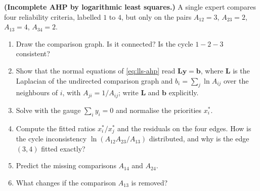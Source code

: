 \documentclass[graybox,envcountchap]{style/SNmono}
\begin{document}
\begin{prob}\label{prob:ch03:9}
\textbf{(Incomplete AHP by logarithmic least squares.)} A single expert compares four reliability criteria, labelled $1$ to $4$, but only on the pairs
$A_{12}=3$, $A_{23}=2$, $A_{13}=4$, $A_{34}=2$.
\begin{enumerate}
\item[(a)] Draw the comparison graph. Is it connected? Is the cycle $1\!-\!2\!-\!3$ consistent?
\item[(b)] Show that the normal equations of \eqref{eq:lls-ahp} read $\mathbf{L}\bm{y}=\bm{b}$, where $\mathbf{L}$ is the Laplacian of the undirected comparison graph and $b_i=\sum_{j}\ln A_{ij}$ over the neighbours of $i$, with $A_{ji}=1/A_{ij}$; write $\mathbf{L}$ and $\bm{b}$ explicitly.
\item[(c)] Solve with the gauge $\sum_i y_i=0$ and normalise the priorities $x_i^{*}$.
\item[(d)] Compute the fitted ratios $x_i^{*}/x_j^{*}$ and the residuals on the four edges. How is the cycle inconsistency $\ln(A_{12}A_{23}/A_{13})$ distributed, and why is the edge $(3,4)$ fitted exactly?
\item[(e)] Predict the missing comparisons $A_{14}$ and $A_{24}$.
\item[(f)] What changes if the comparison $A_{13}$ is removed?
\end{enumerate}
\end{prob}
\end{document}
